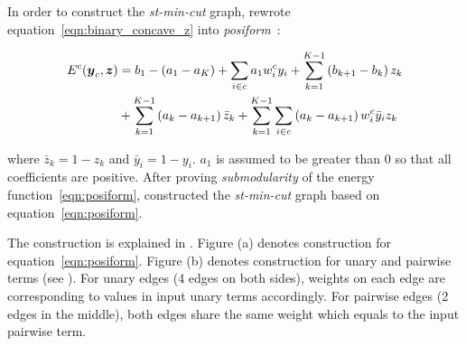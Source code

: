 In order to construct the \emph{st-min-cut} graph,
 rewrote
equation~\eqref{eqn:binary_concave_z} into
\emph{posiform}~\cite{Boros:MATH02}:

\begin{align}
  \label{eqn:posiform}  
  E^c(\by_c, \bz)
  &= b_1 - (a_1 - a_K) + \sum_{i \in c} a_1 w^c_i y_i
  {}+ \sum_{k = 1}^{K - 1} \left( b_{k+1} - b_k \right) z_k\\
  &+ \sum_{k = 1}^{K - 1} \left( a_k - a_{k+1} \right) \bar{z}_k
  {}+ \sum_{k = 1}^{K - 1} \sum_{i \in c} \left( a_k - a_{k+1}
    \right) w^c_i \bar{y}_i z_k \nonumber
\end{align}

\noindent where $\bar{z}_k = 1 - z_k$ and $\bar{y}_i = 1 - y_i$.
$a_1$ is assumed to be greater than $0$ so that all coefficients
are positive. After proving \emph{submodularity} of the energy
function~\eqref{eqn:posiform}, 
constructed the \emph{st-min-cut} graph based on
equation~\eqref{eqn:posiform}.

The construction is explained in . Figure
(a) denotes construction for equation~\eqref{eqn:posiform}.
Figure (b) denotes construction for unary and pairwise terms (see
\cite{Kolmogorov:PAMI04}). For unary edges (4 edges on both
sides), weights on each edge are corresponding to values in input
unary terms accordingly. For pairwise edges (2 edges in the
middle), both edges share the same weight which equals to the
input pairwise term.




